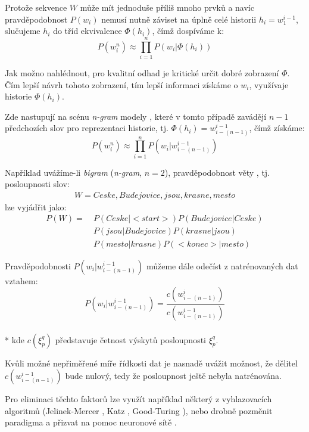 Protože sekvence $W$ může mít jednoduše příliš mnoho prvků a navíc pravděpodobnost $P(w_i)$ nemusí nutně záviset na úplně celé historii $h_i = w_1^{i-1}$, slučujeme $h_i$ do tříd ekvivalence $\Phi (h_i)$, čímž dospíváme k:
%
\begin{equation}
	\label{eq:lm_ec}
	P(w^n_i) \approx \prod\limits_{i=1}^n P(w_i|\Phi (h_i))
\end{equation}

Jak možno nahlédnout, pro kvalitní odhad je kritické určit dobré zobrazení $\Phi$. Čím lepší návrh tohoto zobrazení, tím lepší informaci získáme o $w_i$, využívaje historie $\Phi (h_i)$.

Zde nastupují na scénu {\sl n-gram} modely \cite{byeo_2012}\cite{masa_1997}, které v tomto případě zavádějí $n-1$ předchozích slov pro reprezentaci historie, tj. $\Phi (h_i) = w_{i-(n-1)}^{i-1}$, čímž získáme:
%
\begin{equation}
	\label{eq:lm_ec}
	P(w^n_i) \approx \prod\limits_{i=1}^n P(w_i|w_{i-(n-1)}^{i-1})
\end{equation}

Například uvážíme-li {\sl bigram} ({\sl n-gram}, $n = 2$), pravděpodobnost věty , tj. posloupnosti slov:
%
\begin{align*}
	W = Ceske, Budejovice, jsou, krasne, mesto
\end{align*}
%
lze vyjádřit jako:
%
\begin{align*}
	P(W) =&~P(Ceske|<\! start\!>)P(Budejovice|Ceske)\\
	      &~P(jsou|Budejovice)P(krasne|jsou)\\
	      &~P(mesto|krasne)P(<\! konec\!>|mesto)
\end{align*}

Pravděpodobnosti $P(w_i|w_{i-(n-1)}^{i-1})$ můžeme dále odečíst z natrénovaných dat vztahem:
%
\begin{equation}
	\label{eq:lm_est}
	P(w_i|w_{i-(n-1)}^{i-1}) = \frac{c(w_{i-(n-1)}^{i})}{c(w_{i-(n-1)}^{i-1})}
\end{equation}
\\*
kde $c(\xi_p^q)$ představuje četnost výskytů posloupnosti $\xi_p^q$.

Kvůli možné nepřiměřené míře řídkosti dat je nasnadě uvážit možnost, že dělitel $c(w_{i-(n-1)}^{i-1})$ bude nulový, tedy že posloupnost ještě nebyla natrénována. 

Pro eliminaci těchto faktorů lze využít například některý z vyhlazovacích algoritmů (Jelinek-Mercer \cite{jelinek_1980}, Katz \cite{katz_1987}, Good-Turing \cite{church_1991}), nebo drobně pozměnit paradigma a přizvat na pomoc neuronové sítě \cite{chienli_2013}.

